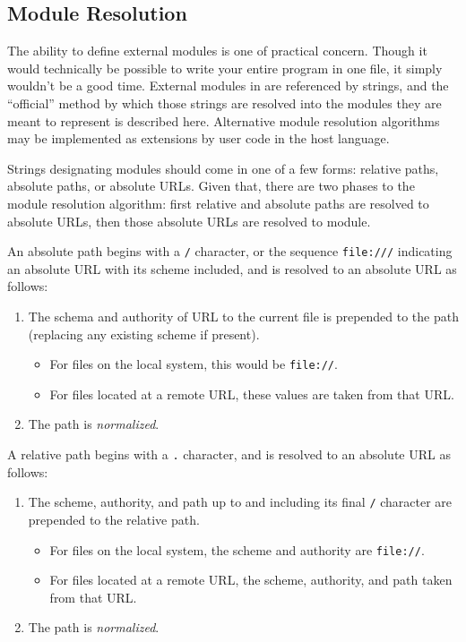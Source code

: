 \subsection{Module Resolution}
\label{sec:module-resolution}

The ability to define external modules is one of practical concern. Though it
would technically be possible to write your entire program in one file,
it simply wouldn't be a good time. External modules in \Trilogy{} are
referenced by strings, and the ``official'' method by which those strings
are resolved into the modules they are meant to represent is described here.
Alternative module resolution algorithms may be implemented as extensions by
user code in the host language.

Strings designating modules should come in one of a few forms: relative paths,
absolute paths, or absolute URLs. Given that, there are two phases to the module
resolution algorithm: first relative and absolute paths are resolved to absolute
URLs, then those absolute URLs are resolved to module.

An absolute path begins with a \texttt{/} character, or the sequence \texttt{file:///}
indicating an absolute URL with its scheme included, and is resolved to an absolute
URL as follows:

\begin{enumerate}
    \item The schema and authority of URL to the current \Trilogy{} file is prepended
    to the path (replacing any existing scheme if present).
    \begin{itemize}
        \item For files on the local system, this would be \texttt{file://}.
        \item For files located at a remote URL, these values are taken from that URL.
    \end{itemize}
    \item The path is \emph{normalized}.
\end{enumerate}

\noindent
A relative path begins with a \texttt{.} character, and is resolved to an absolute
URL as follows:

\begin{enumerate}
    \item The scheme, authority, and path up to and including its final \texttt{/} character
    are prepended to the relative path.
    \begin{itemize}
        \item For files on the local system, the scheme and authority are \texttt{file://}.
        \item For files located at a remote URL, the scheme, authority, and path taken
        from that URL.
    \end{itemize}
    \item The path is \emph{normalized}.
\end{enumerate}

